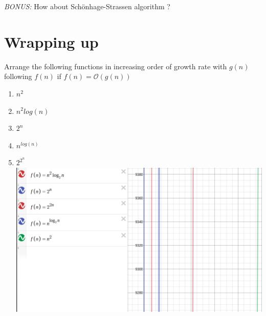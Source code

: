 \documentclass[12pt]{article}
\begin{document}
\emph{BONUS:} How about Sch\"{o}nhage-Strassen algorithm ? 

\section{Wrapping up}

Arrange the following functions in increasing order of growth rate with $g(n)$ following $f(n)$ if $f(n) = \mathcal{O}(g(n))$

\begin{enumerate}
    	\item $n^{2}$
    \item $n^{2}log(n)$
    \item $2^{n}$
    \item $n^{log(n)}$
    \item $2^{2^{n}}$\\
    \includegraphics[height=0.3\textheight]{img1.png}
\end{enumerate}
\end{document}
